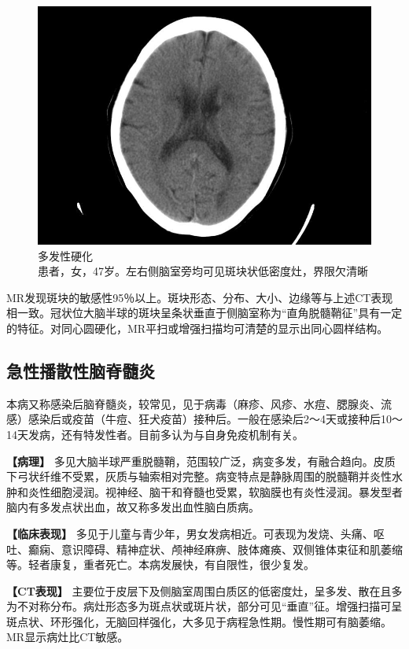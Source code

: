 \begin{figure}[!htbp]
 \centering
 \includegraphics[width=.7\textwidth,height=\textheight,keepaspectratio]{./images/Image00095.jpg}
 \captionsetup{justification=centering}
 \caption{多发性硬化\\{\small 患者，女，47岁。左右侧脑室旁均可见斑块状低密度灶，界限欠清晰}}
 \label{fig2-55}
  \end{figure} 

MR发现斑块的敏感性95％以上。斑块形态、分布、大小、边缘等与上述CT表现相一致。冠状位大脑半球的斑块呈条状垂直于侧脑室称为“直角脱髓鞘征”具有一定的特征。对同心圆硬化，MR平扫或增强扫描均可清楚的显示出同心圆样结构。

\subsection{急性播散性脑脊髓炎}

本病又称感染后脑脊髓炎，较常见，见于病毒（麻疹、风疹、水痘、腮腺炎、流感）感染后或疫苗（牛痘、狂犬疫苗）接种后。一般在感染后2～4天或接种后10～14天发病，还有特发性者。目前多认为与自身免疫机制有关。

\textbf{【病理】}
多见大脑半球严重脱髓鞘，范围较广泛，病变多发，有融合趋向。皮质下弓状纤维不受累，灰质与轴索相对完整。病变特点是静脉周围的脱髓鞘并炎性水肿和炎性细胞浸润。视神经、脑干和脊髓也受累，软脑膜也有炎性浸润。暴发型者脑内有多发点状出血，故又称多发出血性脑白质病。

\textbf{【临床表现】}
多见于儿童与青少年，男女发病相近。可表现为发烧、头痛、呕吐、癫痫、意识障碍、精神症状、颅神经麻痹、肢体瘫痪、双侧锥体束征和肌萎缩等。轻者康复，重者死亡。本病发展快，有自限性，很少复发。

\textbf{【CT表现】}
主要位于皮层下及侧脑室周围白质区的低密度灶，呈多发、散在且多为不对称分布。病灶形态多为斑点状或斑片状，部分可见“垂直”征。增强扫描可呈斑点状、环形强化，无脑回样强化，大多见于病程急性期。慢性期可有脑萎缩。MR显示病灶比CT敏感。

